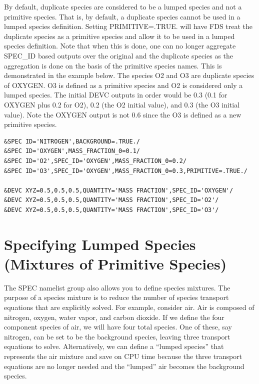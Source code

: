 \documentclass[11pt]{book}
\begin{document}
By default, duplicate species are considered to be a lumped species and not a primitive species.  That is, by default, a duplicate species cannot be used in a lumped species definition.  Setting {\ct PRIMITIVE=.TRUE.} will have FDS treat the duplicate species as a primitive species and allow it to be used in a lumped species definition.  Note that when this is done, one can no longer aggregate {\ct SPEC\_ID} based outputs over the original and the duplicate species as the aggregation is done on the basis of the primitive species names.  This is demonstrated in the example below.  The species {\ct O2} and {\ct O3} are duplicate species of {\ct OXYGEN}.  {\ct O3} is defined as a primitive species and {\ct O2} is considered only a lumped species.  The initial {\ct DEVC} outputs in order would be 0.3 (0.1 for {\ct OXYGEN} plus 0.2 for {\ct O2}), 0.2 (the {\ct O2} initial value), and 0.3 (the {\ct O3} initial value).  Note the {\ct OXYGEN} output is not 0.6 since the {\ct O3} is defined as a new primitive species.
\begin{lstlisting}
&SPEC ID='NITROGEN',BACKGROUND=.TRUE./
&SPEC ID='OXYGEN',MASS_FRACTION_0=0.1/
&SPEC ID='O2',SPEC_ID='OXYGEN',MASS_FRACTION_0=0.2/
&SPEC ID='O3',SPEC_ID='OXYGEN',MASS_FRACTION_0=0.3,PRIMITIVE=.TRUE./

&DEVC XYZ=0.5,0.5,0.5,QUANTITY='MASS FRACTION',SPEC_ID='OXYGEN'/
&DEVC XYZ=0.5,0.5,0.5,QUANTITY='MASS FRACTION',SPEC_ID='O2'/
&DEVC XYZ=0.5,0.5,0.5,QUANTITY='MASS FRACTION',SPEC_ID='O3'/
\end{lstlisting}

\section{Specifying Lumped Species (Mixtures of Primitive Species)}
\label{info:lumped}

The {\ct SPEC} namelist group also allows you to define species mixtures. The purpose of a species mixture is to reduce the number of species transport equations that are explicitly solved. For example, consider air. Air is composed of nitrogen, oxygen, water vapor, and carbon dioxide. If we define the four component species of air, we will have four total species. One of these, say nitrogen, can be set to be the background species, leaving three transport equations to solve. Alternatively, we can define a ``lumped species'' that represents the air mixture and save on CPU time because the three transport equations are no longer needed and the ``lumped'' air becomes the background species.
\end{document}
